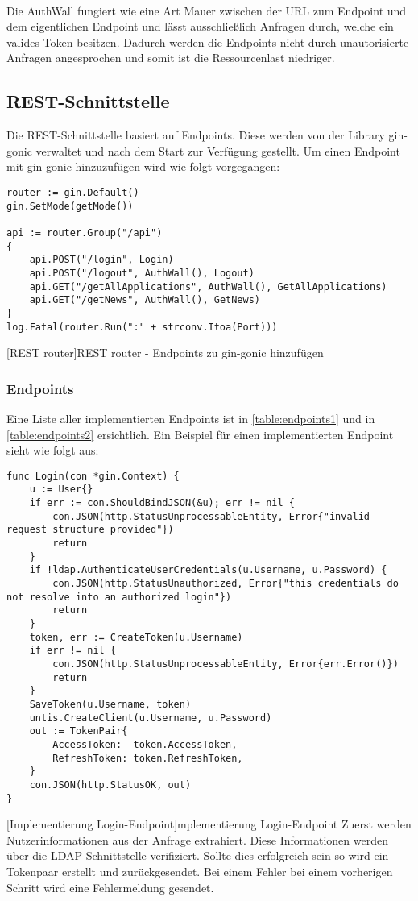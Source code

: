 ~\\
Die AuthWall fungiert wie eine Art Mauer zwischen der URL zum Endpoint und dem eigentlichen Endpoint und lässt ausschließlich Anfragen durch, welche ein valides Token besitzen. \cite{tokenmanager} Dadurch werden die Endpoints nicht durch unautorisierte Anfragen angesprochen und somit ist die Ressourcenlast niedriger.

\newpage

\subsection{REST-Schnittstelle}
Die REST-Schnittstelle basiert auf Endpoints. Diese werden von der Library gin-gonic verwaltet und nach dem Start zur Verfügung gestellt. \cite{gingonic} Um einen Endpoint mit gin-gonic hinzuzufügen wird wie folgt vorgegangen:

\begin{verbatim}
router := gin.Default()
gin.SetMode(getMode())

api := router.Group("/api")
{
	api.POST("/login", Login)
	api.POST("/logout", AuthWall(), Logout)
	api.GET("/getAllApplications", AuthWall(), GetAllApplications)
	api.GET("/getNews", AuthWall(), GetNews)
}
log.Fatal(router.Run(":" + strconv.Itoa(Port)))
\end{verbatim} 
[REST router]{REST router - Endpoints zu gin-gonic hinzufügen}

\subsubsection{Endpoints}

Eine Liste aller implementierten Endpoints ist in \autoref{table:endpoints1} und in \autoref{table:endpoints2} ersichtlich. Ein Beispiel für einen implementierten Endpoint sieht wie folgt aus:

\begin{verbatim}
func Login(con *gin.Context) {
	u := User{}
	if err := con.ShouldBindJSON(&u); err != nil {
		con.JSON(http.StatusUnprocessableEntity, Error{"invalid request structure provided"})
		return
	}
	if !ldap.AuthenticateUserCredentials(u.Username, u.Password) {
		con.JSON(http.StatusUnauthorized, Error{"this credentials do not resolve into an authorized login"})
		return
	}
	token, err := CreateToken(u.Username)
	if err != nil {
		con.JSON(http.StatusUnprocessableEntity, Error{err.Error()})
		return
	}
	SaveToken(u.Username, token)
	untis.CreateClient(u.Username, u.Password)
	out := TokenPair{
		AccessToken:  token.AccessToken,
		RefreshToken: token.RefreshToken,
	}
	con.JSON(http.StatusOK, out)
}
\end{verbatim}
[Implementierung Login-Endpoint]{mplementierung Login-Endpoint}
Zuerst werden Nutzerinformationen aus der Anfrage extrahiert. Diese Informationen werden über die LDAP-Schnittstelle verifiziert. Sollte dies erfolgreich sein so wird ein Tokenpaar erstellt und zurückgesendet. Bei einem Fehler bei einem vorherigen Schritt wird eine Fehlermeldung gesendet.


